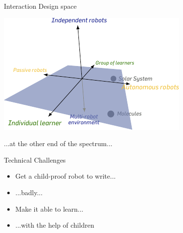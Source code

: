 \documentclass[compress]{beamer}
\begin{document}





{
 \begin{frame}{Interaction Design space}
     \begin{center}
         \includegraphics[width=0.8\linewidth]{cellulo/interaction-space}
     \end{center}
 \end{frame}
 }


 \begin{frame}[plain]{}
     ...at the other end of the spectrum...
 \end{frame}


\begin{frame}[label=cowriter-impl]{Technical Challenges}
    \begin{itemize}
        \item<1-> Get a child-proof robot to write...
        \item<2-> ...badly...
        \item<3-> Make it able to learn...
        \item<4-> ...with the help of children
    \end{itemize}
\end{frame}
\end{document}
